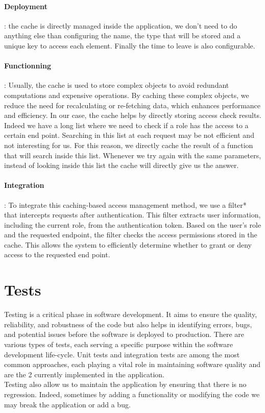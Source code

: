 \documentclass[12pt,a4paper,table,english]{article}
\begin{document}
	
	\paragraph{Deployment}: the cache is directly managed inside the application, we don't need to do anything else than configuring the name, the type that will be stored and a unique key to access each element. Finally the time to leave is also configurable. 
	
	
	\paragraph{Functionning}: Usually, the cache is used to store complex objects to avoid redundant computations and expensive operations. By caching these complex objects, we reduce the need for recalculating or re-fetching data, which enhances performance and efficiency.  
	In our case, the cache helps by directly storing access check results. Indeed we have a long list where we need to check if a role has the access to a certain end point. Searching in this list at each request may be not efficient and not interesting for us. For this reason, we directly cache the result of a function that will search inside this list. Whenever we try again with the same parameters, instead of looking inside this list the cache will directly give us the answer. 
	
	
	\paragraph{Integration}: To integrate this caching-based access management method, we use a filter* that intercepts requests after authentication. This filter extracts user information, including the current role, from the authentication token. Based on the user's role and the requested endpoint, the filter checks the access permissions stored in the cache. This allows the system to efficiently determine whether to grant or deny access to the requested end point. 
	
	\newpage
	
	\section{Tests}
	
	Testing is a critical phase in software development. It aims to ensure the quality, reliability, and robustness of the code but also helps in identifying errors, bugs, and potential issues before the software is deployed to production. There are various types of tests, each serving a specific purpose within the software development life-cycle. Unit tests and integration tests\citep{TESTBD, TESTOC} are among the most common approaches, each playing a vital role in maintaining software quality and are the 2 currently implemented in the application.\\
	Testing also allow us to maintain the application by ensuring that there is no regression. Indeed, sometimes by adding a functionality or modifying the code we may break the application or add a bug.
	
\end{document}
